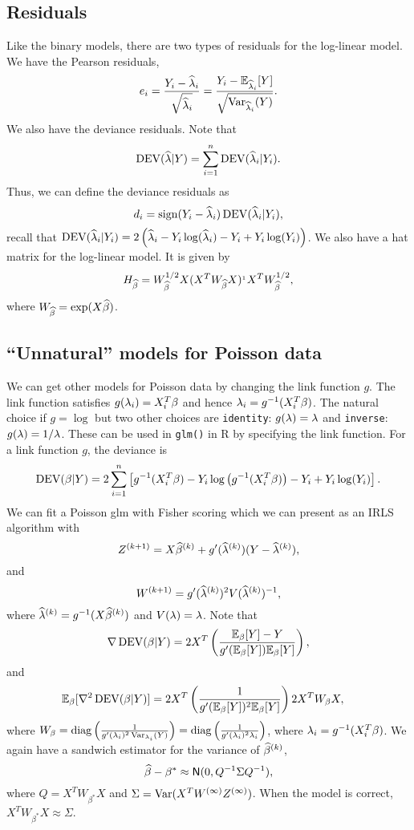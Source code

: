 {\subsection{Residuals}
Like the binary models, there are two types of residuals for the log-linear model. We have the Pearson residuals,
\[e_i = \frac{Y_i-\widehat{\lambda}_i}{\sqrt{\widehat{\lambda}_i}} = \frac{Y_i - {\mathbb{E}}_{\widehat{\lambda}_i}[Y]}{\sqrt{\operatorname{Var}_{\widehat{\lambda}_i}(Y)}}. \]
We also have the deviance residuals. Note that
\[\operatorname{DEV}(\widehat{\lambda}|Y) = \sum_{i=1}^n \operatorname{DEV}(\widehat{\lambda}_i|Y_i). \]
Thus, we can define the deviance residuals as 
\[d_i = \text{sign}(Y_i - \widehat{\lambda}_i)\operatorname{DEV}(\widehat{\lambda}_i|Y_i), \]
recall that $\operatorname{DEV}(\widehat{\lambda}_i|Y_i) = 2\left(\widehat{\lambda}_i-Y_i\log(\widehat{\lambda}_i)-Y_i+Y_i\log(Y_i)\right)$. We also have a hat matrix for the log-linear model. It is given by
\[H_{\widehat{\beta}} = W_{\widehat{\beta}}^{1/2}X(X^TW_{\widehat{\beta}}X)^{_1}X^TW_{\widehat{\beta}}^{1/2}, \]
where $W_{\widehat{\beta}}=\exp(X\widehat{\beta})$.
\subsection{``Unnatural'' models for Poisson data}
We can get other models for Poisson data by changing the link function $g$. The link function satisfies $g(\lambda_i) = X_i^T\beta$ and hence $\lambda_i = g^{-1}(X_i^T\beta)$. The natural choice if $g = \log$ but two other choices are \texttt{identity}: $g(\lambda) = \lambda$ and \texttt{inverse}: $g(\lambda) = 1/\lambda$. These can be used in \texttt{glm()} in R by specifying the link function. For a link function $g$, the deviance is
\[\operatorname{DEV}(\beta|Y) = 2\sum_{i=1}^n \left[g^{-1}(X_i^T\beta)-Y_i\log\left(g^{-1}(X_i^T\beta)\right)-Y_i + Y_i\log(Y_i)\right].\]
We can fit a Poisson glm with Fisher scoring which we can present as an IRLS algorithm with
\[Z^{(k+1)} = X\widehat{\beta}^{(k)}+g'(\widehat{\lambda}^{(k)})(Y-\widehat{\lambda}^{(k)}), \]
and 
\[W^{(k+1)} = g'(\widehat{\lambda}^{(k)})^2 V(\widehat{\lambda}^{(k)})^{-1}, \]
where $\widehat{\lambda}^{(k)} = g^{-1}(X\widehat{\beta}^{(k)})$ and $V(\lambda) = \lambda$. Note that 
\[\nabla \operatorname{DEV}(\beta|Y) = 2X^T\left(\frac{{\mathbb{E}}_{\beta}[Y]-Y}{g'({\mathbb{E}}_{\beta}[Y]){\mathbb{E}}_{\beta}[Y]}\right),\]
and 
\begin{align*}
    {\mathbb{E}}_\beta[\nabla^2 \operatorname{DEV}(\beta|Y)]&=2X^T\left(\frac{1}{g'({\mathbb{E}}_{\beta}[Y])^2{\mathbb{E}}_{\beta}[Y]}\right)
    2X^TW_\beta X,
\end{align*}
where $W_\beta = \operatorname{diag}\left(\frac{1}{g'(\lambda_i)^2\operatorname{Var}_{\lambda_i}(Y)}\right)=\operatorname{diag}\left(\frac{1}{g'(\lambda_i)^2\lambda_i}\right)$, where $\lambda_i = g^{-1}(X_i^T\beta)$. We again have a sandwich estimator for the variance of $\widehat{\beta}^{(k)}$,
\[\widehat{\beta}-\beta^* \approx \mathsf{N}(0, Q^{-1}\Sigma Q^{-1}),\]
where $Q = X^TW_{\beta^*} X$ and $\Sigma = \operatorname{Var}(X^TW^{(\infty)}Z^{(\infty)})$. When the model is correct, $X^TW_{\beta^*}X \approx \Sigma$. 
}

